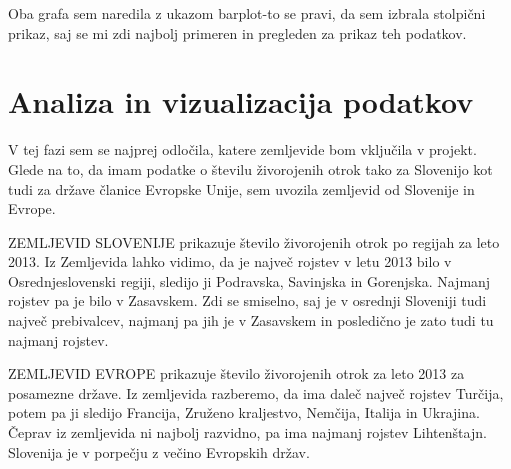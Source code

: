 \documentclass[11pt,a4paper]{article}
\begin{document}
Oba grafa sem naredila z ukazom barplot-to se pravi, da sem izbrala stolpični prikaz, saj se mi zdi najbolj primeren in pregleden za prikaz teh podatkov.



\newpage
\section{Analiza in vizualizacija podatkov}



V tej fazi sem se najprej odločila, katere zemljevide bom vključila v projekt. Glede na to, da imam podatke o številu živorojenih otrok tako za Slovenijo kot tudi za države članice Evropske Unije, sem uvozila zemljevid od Slovenije in Evrope.

ZEMLJEVID SLOVENIJE prikazuje število živorojenih otrok po regijah za leto 2013. Iz Zemljevida lahko vidimo, da je največ rojstev v letu 2013 bilo v Osrednjeslovenski regiji, sledijo ji Podravska, Savinjska in Gorenjska. Najmanj rojstev pa je bilo v Zasavskem. Zdi se smiselno, saj je v osrednji Sloveniji tudi največ prebivalcev, najmanj pa jih je v Zasavskem in posledično je zato tudi tu najmanj rojstev.




\newpage
ZEMLJEVID EVROPE prikazuje število živorojenih otrok za leto 2013 za posamezne države. Iz zemljevida razberemo, da ima daleč največ rojstev Turčija, potem pa ji sledijo Francija, Zruženo kraljestvo, Nemčija, Italija in Ukrajina. Čeprav iz zemljevida ni najbolj razvidno, pa ima najmanj rojstev Lihtenštajn. Slovenija je v porpečju z večino Evropskih držav.



% 
% 
% 
\end{document}
